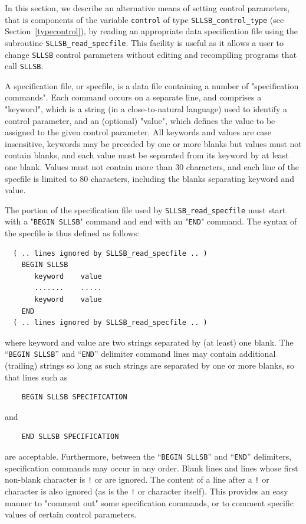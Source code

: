 \documentclass{galahad}
\newcommand{\packagename}{SLLSB}
\begin{document}

\galfeatures
\noindent In this section, we describe an alternative means of setting
control parameters, that is components of the variable {\tt control} of type
{\tt \packagename\_control\_type}
(see Section~\ref{typecontrol}),
by reading an appropriate data specification file using the
subroutine {\tt \packagename\_read\_specfile}. This facility
is useful as it allows a user to change  {\tt \packagename} control parameters
without editing and recompiling programs that call {\tt \packagename}.

A specification file, or specfile, is a data file containing a number of
"specification commands". Each command occurs on a separate line,
and comprises a "keyword",
which is a string (in a close-to-natural language) used to identify a
control parameter, and
an (optional) "value", which defines the value to be assigned to the given
control parameter. All keywords and values are case insensitive,
keywords may be preceded by one or more blanks but
values must not contain blanks, and
each value must be separated from its keyword by at least one blank.
Values must not contain more than 30 characters, and
each line of the specfile is limited to 80 characters,
including the blanks separating keyword and value.

The portion of the specification file used by
{\tt \packagename\_read\_specfile}
must start
with a "{\tt BEGIN \packagename}" command and end with an
"{\tt END}" command.  The syntax of the specfile is thus defined as follows:
\begin{verbatim}
  ( .. lines ignored by SLLSB_read_specfile .. )
    BEGIN SLLSB
       keyword    value
       .......    .....
       keyword    value
    END
  ( .. lines ignored by SLLSB_read_specfile .. )
\end{verbatim}
where keyword and value are two strings separated by (at least) one blank.
The ``{\tt BEGIN \packagename}'' and ``{\tt END}'' delimiter command lines
may contain additional (trailing) strings so long as such strings are
separated by one or more blanks, so that lines such as
\begin{verbatim}
    BEGIN SLLSB SPECIFICATION
\end{verbatim}
and
\begin{verbatim}
    END SLLSB SPECIFICATION
\end{verbatim}
are acceptable. Furthermore,
between the
``{\tt BEGIN \packagename}'' and ``{\tt END}'' delimiters,
specification commands may occur in any order.  Blank lines and
lines whose first non-blank character is {\tt !} or {\tt *} are ignored.
The content
of a line after a {\tt !} or {\tt *} character is also
ignored (as is the {\tt !} or {\tt *}
character itself). This provides an easy manner to "comment out" some
specification commands, or to comment specific values
of certain control parameters.
\end{document}

